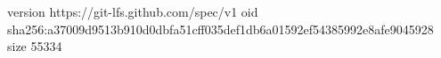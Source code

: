 version https://git-lfs.github.com/spec/v1
oid sha256:a37009d9513b910d0dbfa51cff035def1db6a01592ef54385992e8afe9045928
size 55334
